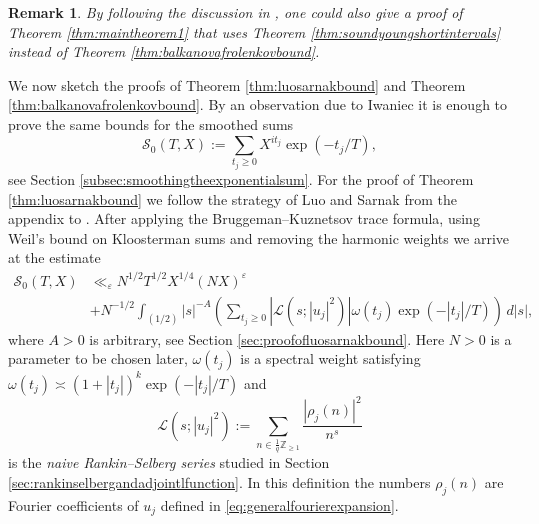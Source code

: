 \documentclass{article}
\newtheorem{remark}[thm]{Remark}
\theoremstyle{named}
\newcommand{\Z}{\mathbb{Z}}
\renewcommand{\L}{\mathcal{L}}
\renewcommand{\S}{\mathcal{S}}
\begin{document}
\begin{remark}
By following the discussion in \cite[Section 3]{Soundararajan_2013}, one could also give a proof of Theorem \ref{thm:maintheorem1} that uses Theorem \ref{thm:soundyoungshortintervals} instead of Theorem \ref{thm:balkanovafrolenkovbound}. 
\end{remark}

We now sketch the proofs of Theorem \ref{thm:luosarnakbound} and Theorem \ref{thm:balkanovafrolenkovbound}. By an observation due to Iwaniec it is enough to prove the same bounds for the smoothed sums 
\begin{equation*}
    \S_0(T, X) := \sum_{t_j \geq 0}X^{it_j}\exp(-t_j/T),
\end{equation*}
see Section \ref{subsec:smoothingtheexponentialsum}. For the proof of Theorem \ref{thm:luosarnakbound} we follow the strategy of Luo and Sarnak from the appendix to \cite{luosarnak}. After applying the Bruggeman--Kuznetsov trace formula, using Weil's bound on Kloosterman sums and removing the harmonic weights we arrive at the estimate 
\begin{equation}\label{eq:estimateforS0afterapplyingkuznetsov}
\begin{aligned}
    \S_0(T, X) & \ll_\varepsilon N^{1/2}T^{1/2}X^{1/4}(NX)^\varepsilon\\
    & +  N^{-1/2}\int_{(1/2)} |s|^{-A} \left(\sum_{t_j \geq 0} |\L(s; |u_j|^2)| \omega(t_j) \exp(-|t_j|/T) \right)\, d|s|,
\end{aligned}
\end{equation}
where $A > 0$ is arbitrary, see Section \ref{sec:proofofluosarnakbound}. Here $N > 0$ is a parameter to be chosen later, $\omega(t_j)$ is a spectral weight satisfying $\omega(t_j) \asymp (1 + |t_j|)^k \exp(-|t_j|/T)$ and
\begin{equation}\label{eq:naiverankinselbergintro}
    \L(s; |u_j|^2) := \sum_{n \in \frac{1}{q}\Z_{\geq 1}} \frac{|\rho_j(n)|^2}{n^s}
\end{equation}
is the \emph{naive Rankin--Selberg series} studied in Section \ref{sec:rankinselbergandadjointlfunction}. In this definition the numbers $\rho_j(n)$ are Fourier coefficients of $u_j$ defined in \eqref{eq:generalfourierexpansion}.
\end{document}

